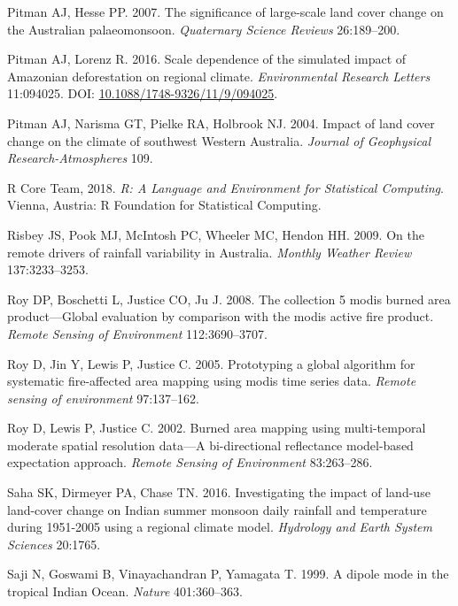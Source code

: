 \documentclass[fleqn,10pt,lineno]{wlpeerj} %
\theoremstyle{definition}
\theoremstyle{definition}
\theoremstyle{definition}
\theoremstyle{remark}
\begin{document}
\hypertarget{ref-Pitman2007}{}
Pitman AJ, Hesse PP. 2007. The significance of large-scale land cover
change on the Australian palaeomonsoon. \emph{Quaternary Science
Reviews} 26:189--200.

\hypertarget{ref-pitman_scale_2016}{}
Pitman AJ, Lorenz R. 2016. Scale dependence of the simulated impact of
Amazonian deforestation on regional climate. \emph{Environmental
Research Letters} 11:094025. DOI:
\href{https://doi.org/10.1088/1748-9326/11/9/094025}{10.1088/1748-9326/11/9/094025}.

\hypertarget{ref-Pitman2004}{}
Pitman AJ, Narisma GT, Pielke RA, Holbrook NJ. 2004. Impact of land
cover change on the climate of southwest Western Australia.
\emph{Journal of Geophysical Research-Atmospheres} 109.

\hypertarget{ref-Rstats2018}{}
R Core Team, 2018. \emph{R: A Language and Environment for Statistical
Computing}. Vienna, Austria: R Foundation for Statistical Computing.

\hypertarget{ref-Risbey2009}{}
Risbey JS, Pook MJ, McIntosh PC, Wheeler MC, Hendon HH. 2009. On the
remote drivers of rainfall variability in Australia. \emph{Monthly
Weather Review} 137:3233--3253.

\hypertarget{ref-Roy2008}{}
Roy DP, Boschetti L, Justice CO, Ju J. 2008. The collection 5 modis
burned area product---Global evaluation by comparison with the modis
active fire product. \emph{Remote Sensing of Environment}
112:3690--3707.

\hypertarget{ref-Roy2005}{}
Roy D, Jin Y, Lewis P, Justice C. 2005. Prototyping a global algorithm
for systematic fire-affected area mapping using modis time series data.
\emph{Remote sensing of environment} 97:137--162.

\hypertarget{ref-Roy2002}{}
Roy D, Lewis P, Justice C. 2002. Burned area mapping using
multi-temporal moderate spatial resolution data---A bi-directional
reflectance model-based expectation approach. \emph{Remote Sensing of
Environment} 83:263--286.

\hypertarget{ref-saha_investigating_2016}{}
Saha SK, Dirmeyer PA, Chase TN. 2016. Investigating the impact of
land-use land-cover change on Indian summer monsoon daily rainfall and
temperature during 1951-2005 using a regional climate model.
\emph{Hydrology and Earth System Sciences} 20:1765.

\hypertarget{ref-Saji1999}{}
Saji N, Goswami B, Vinayachandran P, Yamagata T. 1999. A dipole mode in
the tropical Indian Ocean. \emph{Nature} 401:360--363.
\end{document}
